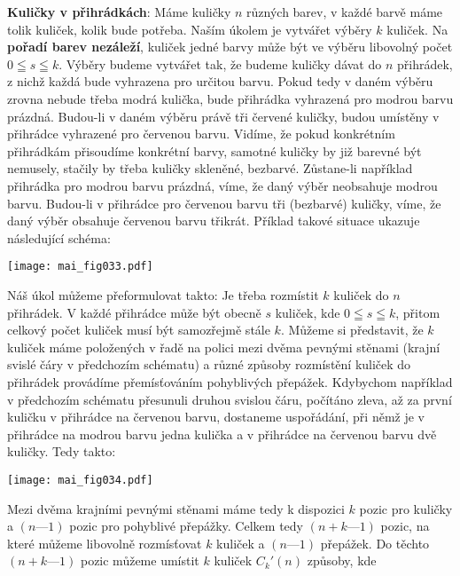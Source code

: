 \begin{example}\label{mai:exam009}
  \textbf{Kuličky v přihrádkách}:\newline
  Máme kuličky \(n\) různých barev, v každé barvě máme tolik kuliček, kolik bude potřeba. Naším 
  úkolem je vytvářet výběry \(k\) kuliček. Na \textbf{pořadí barev nezáleží}, kuliček jedné barvy 
  může být ve výběru libovolný počet \(0\leqq s \leqq k\). Výběry budeme vytvářet tak, že budeme 
  kuličky dávat do \(n\) přihrádek, z nichž každá bude vyhrazena pro určitou barvu. Pokud tedy v 
  daném výběru zrovna nebude třeba modrá kulička, bude přihrádka vyhrazená pro modrou barvu 
  prázdná. Budou-li v daném výběru právě tři červené kuličky, budou umístěny v přihrádce vyhrazené 
  pro červenou barvu. Vidíme, že pokud konkrétním přihrádkám přisoudíme konkrétní barvy, samotné 
  kuličky by již barevné být nemusely, stačily by třeba kuličky skleněné, bezbarvé. Zůstane-li 
  například přihrádka pro modrou barvu prázdná, víme, že daný výběr neobsahuje modrou barvu. 
  Budou-li v přihrádce pro červenou barvu tři (bezbarvé) kuličky, víme, že daný výběr obsahuje 
  červenou barvu třikrát. Příklad takové situace ukazuje následující schéma:
  
  {\centering
    \texttt{[image: mai\_fig033.pdf]}
    \par}

  Náš úkol můžeme přeformulovat takto: Je třeba rozmístit \(k\) kuliček do \(n\) přihrádek. V každé 
  přihrádce může být obecně \(s\) kuliček, kde \(0\leqq s \leqq k\), přitom celkový počet kuliček 
  musí být samozřejmě stále \(k\). Můžeme si představit, že \(k\) kuliček máme položených v řadě na 
  polici mezi dvěma pevnými stěnami (krajní svislé čáry v předchozím schématu) a různé způsoby 
  rozmístění kuliček do přihrádek provádíme přemísťováním pohyblivých přepážek. Kdybychom například 
  v předchozím schématu přesunuli druhou svislou čáru, počítáno zleva, až za první kuličku v 
  přihrádce na červenou barvu, dostaneme uspořádání, při němž je v přihrádce na modrou barvu jedna 
  kulička a v přihrádce na červenou barvu dvě kuličky. Tedy takto:

  {\centering
    \texttt{[image: mai\_fig034.pdf]}
    \par}

  Mezi dvěma krajními pevnými stěnami máme tedy k dispozici \(k\) pozic pro kuličky a \((n — 1)\) 
  pozic pro pohyblivé přepážky. Celkem tedy \((n + k — 1)\) pozic, na které můžeme libovolně 
  rozmísťovat \(k\) kuliček a \((n — 1)\) přepážek. Do těchto \((n + k — 1)\) pozic můžeme umístit 
  \(k\) kuliček \(C_k'(n)\) způsoby, kde
  

\end{example}
